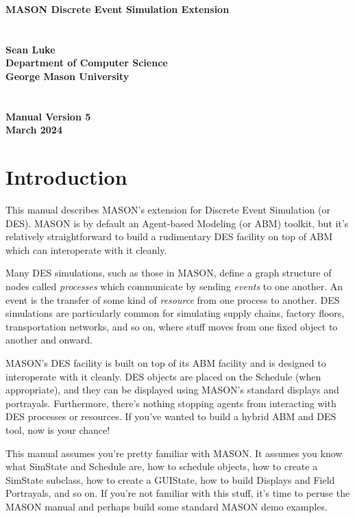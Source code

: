\documentclass[twoside,10pt]{article}
\newcommand\booktitle{MASON Discrete Event Simulation Extension}
\begin{document}
\noindent\huge\bf \booktitle\\
\\
\\
\Large\bf Sean Luke\\
{\large\rm 
Department of Computer Science\\
George Mason University}
\\
\\
\\
\large\rm {\bf Manual Version 5}\\
\large\rm March 2024\\

\clearpage



\normalsize
\cleardoublepage

\tableofcontents
\clearpage

\section{Introduction}

This manual describes MASON's extension for Discrete Event Simulation (or DES).  MASON is by default an Agent-based Modeling (or ABM) toolkit, but it's relatively straightforward to build a rudimentary DES facility on top of ABM which can interoperate with it cleanly.

Many DES simulations, such as those in MASON, define a graph structure of nodes called {\it processes} which communicate by sending {\it events} to one another.  An event is the transfer of some kind of {\it resource} from one process to another.   DES simulations are particularly common for simulating supply chains, factory floors, transportation networks, and so on, where stuff moves from one fixed object to another and onward.

MASON's DES facility is built on top of its ABM facility and is designed to interoperate with it cleanly.  DES objects are placed on the Schedule (when appropriate), and they can be displayed using MASON's standard displays and portrayals.  Furthermore, there's nothing stopping agents from interacting with DES processes or resources.  If you've wanted to build a hybrid ABM and DES tool, now is your chance!

This manual assumes you're pretty familiar with MASON.  It assumes you know what SimState and Schedule are, how to schedule objects, how to create a SimState subclass, how to create a GUIState, how to build Displays and Field Portrayals, and so on.  If you're not familiar with this stuff, it's time to peruse the MASON manual and perhaps build some standard MASON demo examples.
\end{document}
